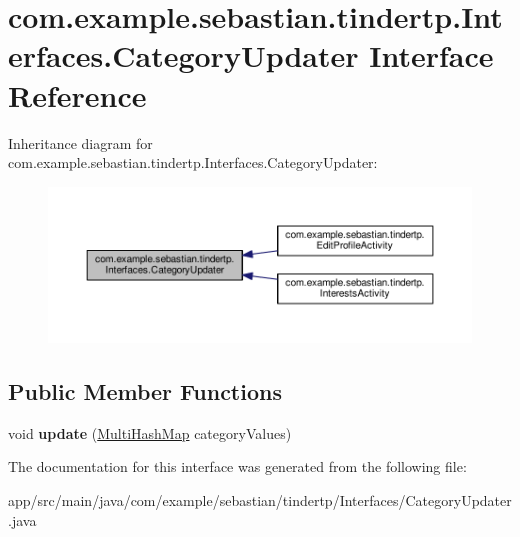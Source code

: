 \hypertarget{interfacecom_1_1example_1_1sebastian_1_1tindertp_1_1Interfaces_1_1CategoryUpdater}{}\section{com.\+example.\+sebastian.\+tindertp.\+Interfaces.\+Category\+Updater Interface Reference}
\label{interfacecom_1_1example_1_1sebastian_1_1tindertp_1_1Interfaces_1_1CategoryUpdater}


Inheritance diagram for com.\+example.\+sebastian.\+tindertp.\+Interfaces.\+Category\+Updater\+:\nopagebreak
\begin{figure}[H]
\begin{center}
\leavevmode
\includegraphics[width=350pt]{interfacecom_1_1example_1_1sebastian_1_1tindertp_1_1Interfaces_1_1CategoryUpdater__inherit__graph}
\end{center}
\end{figure}
\subsection*{Public Member Functions}
\begin{DoxyCompactItemize}
\item 
void {\bfseries update} (\hyperlink{classcom_1_1example_1_1sebastian_1_1tindertp_1_1commonTools_1_1MultiHashMap}{Multi\+Hash\+Map} category\+Values)\hypertarget{interfacecom_1_1example_1_1sebastian_1_1tindertp_1_1Interfaces_1_1CategoryUpdater_ac32f4c1e7b6cb5486895de558efa5570}{}\label{interfacecom_1_1example_1_1sebastian_1_1tindertp_1_1Interfaces_1_1CategoryUpdater_ac32f4c1e7b6cb5486895de558efa5570}

\end{DoxyCompactItemize}


The documentation for this interface was generated from the following file\+:\begin{DoxyCompactItemize}
\item 
app/src/main/java/com/example/sebastian/tindertp/\+Interfaces/Category\+Updater.\+java\end{DoxyCompactItemize}
